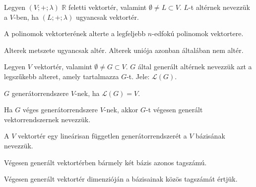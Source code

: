 \begin{definition}[Altér]
  Legyen $(V; +; \lambda)$ $\mathbb R$ feletti vektortér, valamint
  $\emptyset \neq L \subset V$. $L$-t altérnek nevezzük a $V$-ben, ha
  $(L; +; \lambda)$ ugyancsak vektortér.
\end{definition}

\begin{example}
  A polinomok vektorterének alterte a legfeljebb $n$-edfokú polinomok
  vektortere.
\end{example}

\begin{statement}
  Alterek metszete ugyancsak altér. Alterek uniója azonban általában nem altér.
\end{statement}

\begin{definition}[Generátorrendszer]
  Legyen $V$ vektortér, valamint $\emptyset \neq G \subset V$. $G$ által
  generált altérnek nevezzük azt a legszűkebb alteret, amely tartalmazza $G$-t.
  Jele: $\mathcal L(G)$.

  $G$ generátorrendszere $V$-nek, ha $\mathcal L(G) = V$.
\end{definition}

\begin{note}
  Ha $G$ véges generátorrendszere $V$-nek, akkor $G$-t végesen generált
  vektorrendszernek nevezzük.
\end{note}

\begin{definition}[Bázis]
  A $V$ vektortér egy lineárisan független generátorrendszerét a $V$
  bázisának nevezzük.
\end{definition}

\begin{statement}
  Végesen generált vektortérben bármely két bázis azonos tagszámú.
\end{statement}

\begin{definition}
  Végesen generált vektortér dimenzióján a bázisainak közös tagszámát értjük.
\end{definition}


